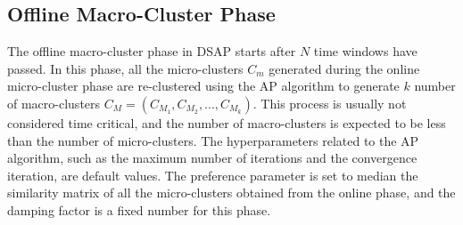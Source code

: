 









\subsection{Offline Macro-Cluster Phase}

The offline macro-cluster phase in DSAP starts after $N$ time windows have passed. In this phase, all the micro-clusters $C_m$ generated during the online micro-cluster phase are re-clustered using the AP algorithm to generate $k$ number of macro-clusters $C_M = (C_{M_1}, C_{M_2}, ..., C_{M_k})$. This process is usually not considered time critical, and the number of macro-clusters is expected to be less than the number of micro-clusters. The hyperparameters related to the AP algorithm, such as the maximum number of iterations and the convergence iteration, are default values. The preference parameter is set to median the similarity matrix of all the micro-clusters obtained from the online phase, and the damping factor is a fixed number for this phase.



